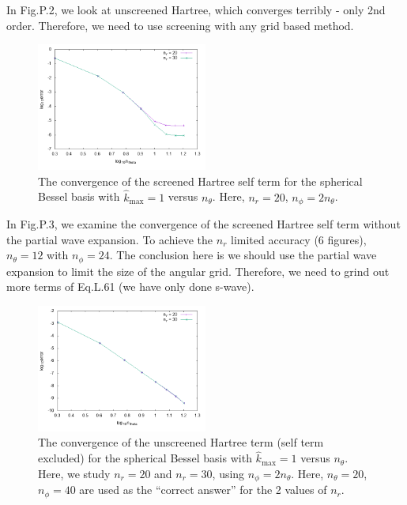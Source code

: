 \documentclass[paper=a4, fontsize=11pt]{article} %
\numberwithin{equation}{section} %
\numberwithin{figure}{section} %
\numberwithin{table}{section} %
\begin{document}
In Fig.P.2, we look at unscreened Hartree, which converges terribly - only 2nd order. Therefore, we need to use screening with any grid based method.

\begin{figure}[h!] 
    \centering
    \includegraphics[width=0.5\textwidth]{nthetaHarself}
    \caption{The convergence of the screened Hartree self term for the spherical Bessel basis with $\hat {k}_{\mathrm{max}} = 1$ versus $n_{\theta}$. Here, $n_r = 20$, $n_{\phi} = 2n_{\theta}$.} 
    \label{fig:nthetaHarself}
\end{figure}

In Fig.P.3, we examine the convergence of the screened Hartree self term without the partial wave expansion. To achieve the $n_r$ limited accuracy (6 figures), $n_{\theta} = 12$ with $n_{\phi} = 24$. The conclusion here is we should use the partial wave expansion to limit the size of the angular grid. Therefore, we need to grind out more terms of Eq.L.61 (we have only done s-wave).

\begin{figure}[h!] 
    \centering
    \includegraphics[width=0.5\textwidth]{nthetaHarwoself}
    \caption{The convergence of the unscreened Hartree term (self term excluded) for the spherical Bessel basis with $\hat {k}_{\mathrm{max}} = 1$ versus $n_{\theta}$. Here, we study $n_r = 20$ and $n_r = 30$, using $n_{\phi} = 2n_{\theta}$. Here, $n_{\theta} = 20$, $n_{\phi} = 40$ are used as the ``correct answer'' for the 2 values of $n_r$.} 
    \label{fig:nthetaHarwoself}
\end{figure}
\end{document}
